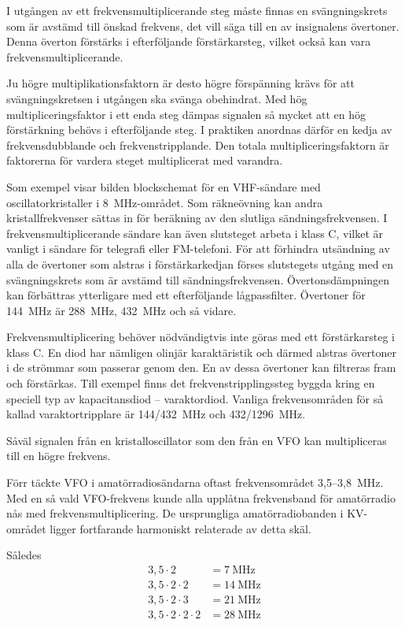 I utgången av ett frekvensmultiplicerande steg måste finnas en
svängningskrets som är avstämd till önskad frekvens, det vill säga till en av insignalens övertoner.
Denna överton förstärks i efterföljande förstärkarsteg, vilket också kan vara
frekvensmultiplicerande.

Ju högre multiplikationsfaktorn är desto högre förspänning krävs för
att svängningskretsen i utgången ska svänga obehindrat.
Med hög multipliceringsfaktor i ett enda steg dämpas signalen så mycket att
en hög förstärkning behövs i efterföljande steg.
I praktiken anordnas därför en kedja av frekvensdubblande och
frekvenstripplande.
Den totala multipliceringsfaktorn är faktorerna för vardera steget
multiplicerat med varandra.

Som exempel visar bilden blockschemat för en VHF-sändare med
oscillatorkristaller i 8~MHz-området.
Som räkneövning kan andra kristallfrekvenser sättas in för beräkning av den
slutliga sändningsfrekvensen.
I frekvensmultiplicerande sändare kan även slutsteget arbeta i klass C, vilket
är vanligt i sändare för telegrafi eller FM-telefoni.
För att förhindra utsändning av alla de övertoner som alstras i
förstärkarkedjan förses slutstegets utgång med en svängningskrets som är
avstämd till sändningsfrekvensen.
Övertonsdämpningen kan förbättras ytterligare med ett efterföljande
lågpassfilter.
Övertoner för 144~MHz är 288~MHz, 432~MHz och så vidare.

Frekvensmultiplicering behöver nödvändigtvis inte göras med ett förstärkarsteg
i klass C.
En diod har nämligen olinjär karaktäristik och därmed alstras övertoner i
de strömmar som passerar genom den.
En av dessa övertoner kan filtreras fram och förstärkas.
Till exempel finns det frekvenstripplingssteg byggda kring en speciell typ av
kapacitansdiod -- varaktordiod.
Vanliga frekvensområden för så kallad varaktortripplare är 144/432~MHz och
432/1296~MHz.

Såväl signalen från en kristalloscillator som den från en VFO kan
multipliceras till en högre frekvens.

Förr täckte VFO i amatörradiosändarna oftast frekvensområdet 3,5--3,8~MHz.
Med en så vald VFO-frekvens kunde alla upplåtna frekvensband för
amatörradio nås med frekvensmultiplicering.
De ursprungliga amatörradiobanden i KV-området ligger fortfarande harmoniskt
relaterade av detta skäl.

Således
\begin{align*}
  3,5 \cdot 2 & = 7\ \text{MHz} \\
  3,5 \cdot 2 \cdot 2 & = 14\ \text{MHz} \\
  3,5 \cdot 2 \cdot 3 & = 21\ \text{MHz} \\
  3,5 \cdot 2 \cdot 2 \cdot 2 & = 28\ \text{MHz} \\
\end{align*}

